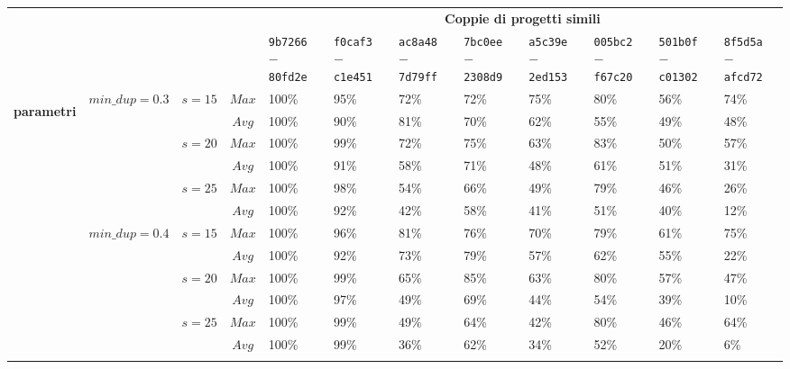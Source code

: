 \begin{landscape}
    \begin{table}[h!]
        \centering
        \begin{tabular}{ p{0.5cm}|c|c|c||p{1.2cm}|p{1.2cm}|p{1.2cm}|p{1.2cm}|p{1.2cm}|p{1.2cm}|p{1.2cm}|p{1.2cm} }
            \multicolumn{4}{c}{} & \multicolumn{8}{c}{\textbf{Coppie di progetti simili}} \\ [1ex]
            \multicolumn{4}{c|}{} & \texttt{9b7266} $-$ \texttt{80fd2e} & \texttt{f0caf3} $-$ \texttt{c1e451} & \texttt{ac8a48} $-$ \texttt{7d79ff} & \texttt{7bc0ee} $-$ \texttt{2308d9} & \texttt{a5c39e} $-$ \texttt{2ed153} & \texttt{005bc2} $-$ \texttt{f67c20} & \texttt{501b0f} $-$ \texttt{c01302} & \texttt{8f5d5a} $-$ \texttt{afcd72} \\ [1ex]
            \hline\hline

            \multirow{18}{*}{\begin{turn}{90}\textbf{parametri}\end{turn}} & \multirow{6}{*}{$min\_dup=0.3$} & \multirow{2}{*}{$s=15$} & $Max$ & 100\% & 95\% & 72\% & 72\% & 75\% & 80\% & 56\% & 74\% \\
            & & & $Avg$ & 100\% & 90\% & 81\% & 70\% & 62\% & 55\% & 49\% & 48\% \\
            & & \multirow{2}{*}{$s=20$} & $Max$ & 100\% & 99\% & 72\% & 75\% & 63\% & 83\% & 50\% & 57\% \\
            & & & $Avg$ & 100\% & 91\% & 58\% & 71\% & 48\% & 61\% & 51\% & 31\% \\
            & & \multirow{2}{*}{$s=25$} & $Max$ & 100\% & 98\% & 54\% & 66\% & 49\% & 79\% & 46\% & 26\% \\
            & & & $Avg$ & 100\% & 92\% & 42\% & 58\% & 41\% & 51\% & 40\% & 12\% \\
            \cline{2-12}

            & \multirow{6}{*}{$min\_dup=0.4$} & \multirow{2}{*}{$s=15$} & $Max$ & 100\% & 96\% & 81\% & 76\% & 70\% & 79\% & 61\% & 75\% \\
            & & & $Avg$ & 100\% & 92\% & 73\% & 79\% & 57\% & 62\% & 55\% & 22\% \\
            & & \multirow{2}{*}{$s=20$} & $Max$ & 100\% & 99\% & 65\% & 85\% & 63\% & 80\% & 57\% & 47\% \\
            & & & $Avg$ & 100\% & 97\% & 49\% & 69\% & 44\% & 54\% & 39\% & 10\% \\
            & & \multirow{2}{*}{$s=25$} & $Max$ & 100\% & 99\% & 49\% & 64\% & 42\% & 80\% & 46\% & 64\% \\
            & & & $Avg$ & 100\% & 99\% & 36\% & 62\% & 34\% & 52\% & 20\% & 6\% \\
            \cline{2-12}


\end{tabular}
\end{table}
\end{landscape}
